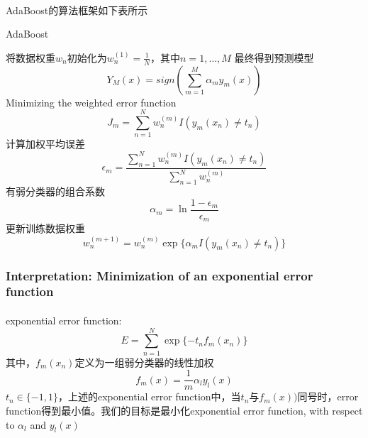 \documentclass[a4paper]{article}
\begin{document}
\paragraph{}
AdaBoost的算法框架如下表所示
\begin{algorithm}[htb]
  \caption{AdaBoost}
  \label{alg:Ada}
  \begin{algorithmic}[1]
	\REQUIRE 将数据权重${w}_n$初始化为${w}_{n}^{(1)}=\frac{1}{N}$，其中$n=1,\dots,M$
  \ENSURE 最终得到预测模型
  \begin{equation}
	\label{1}
	Y_M(x)=sign(\sum_{m=1}^M\alpha_m y_m(x))
  \end{equation}
  	\STATE Minimizing the weighted error function
	\begin{equation}
	  \label{2}
	  J_m=\sum_{n=1}^N w_{n}^{(m)}I(y_m(x_n)\neq t_n)
	\end{equation}
	\STATE 计算加权平均误差
	\begin{equation}
	  \label{3}
	  \epsilon_m = \frac{\sum_{n=1}^N w_{n}^{(m)}I(y_m(x_n) \neq t_n)}{\sum_{n=1}^N w_{n}^{(m)}}
	\end{equation}
	\STATE 有弱分类器的组合系数
	\begin{equation}
	  \label{4}
	  \alpha_m = \ln{{\frac{1-\epsilon_m}{\epsilon_m}}}
	\end{equation}
	\STATE 更新训练数据权重
	\begin{equation}
	  \label{5}
	  w_{n}^{(m+1)}=w_{n}^{(m)}\exp\{\alpha_m I(y_m(x_n) \neq t_n)\}
	\end{equation}
   \ENDFOR
\end{algorithmic}
\end{algorithm}

\subsubsection{Interpretation: Minimization of an exponential error function}
\paragraph{}
exponential error function:
\begin{equation}
	  \label{6}
  E=\sum_{n=1}^N \exp\{-t_n f_m(x_n)\}
\end{equation}
其中，$f_m(x_n)$定义为一组弱分类器的线性加权
\begin{equation}
	  \label{7}
  f_m(x)=\frac{1}{m}\alpha_l y_l(x)
\end{equation}
$t_n \in \{-1,1\}$，上述的exponential error function中，当$t_n$与$f_m(x))$同号时，error function得到最小值。我们的目标是最小化exponential error function, with respect to $\alpha_l$ and $y_l(x)$
\end{document}

